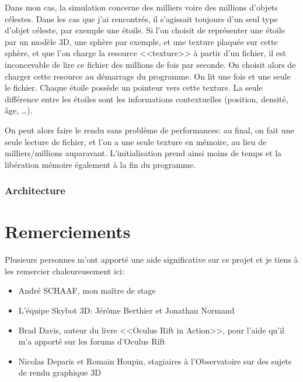 \documentclass[a4paper,french,12pt]{article}
\begin{document}
\begin{description}
	       Dans mon cas, la simulation concerne des milliers voire des millions d'objets célestes. Dans les cas que j'ai
	       rencontrés, il s'agissait toujours d'un seul type d'objet céleste, par exemple une étoile.
	       Si l'on choisit de représenter une étoile par un modèle 3D, une sphère par exemple, et une
	       texture plaquée sur cette sphère, et que l'on charge la resource <<texture>> à partir d'un fichier, il est inconcevable
	       de lire ce fichier des millions de fois par seconde.
	       On choisit alors de charger cette resource au démarrage du programme. On lit une fois et une seule le fichier.
	       Chaque étoile possède un pointeur vers cette texture. 
	       La seule différence entre les étoiles sont les informations contextuelles (position, densité, âge, \ldots).
	       
	       On peut alors faire le rendu sans problème de performances: au final, on fait une seule lecture de fichier, et
	       l'on a une seule texture en mémoire, au lieu de milliers/millions auparavant.
	       L'initialisation prend ainsi moins de temps et la libération mémoire également à la fin du programme.
	    
	    \end{description}

	    
	
	\subsubsection{Architecture}
	

			
\section{Remerciements}

	Plusieurs personnes m’ont apporté une aide significative sur ce projet et je tiens à les remercier chaleureusement ici: 

	\begin{itemize}
	 \item André SCHAAF, mon maître de stage
	 \item L'équipe Skybot 3D: Jérôme Berthier et Jonathan Normand
	 \item Brad Davis, auteur du livre <<Oculus Rift in Action>>, pour l'aide qu'il m'a apporté sur les forums d'Oculus Rift
	 \item Nicolas Deparis et Romain Houpin, stagiaires à l'Observatoire sur des sujets de rendu graphique 3D
	\end{itemize}
\end{document}
